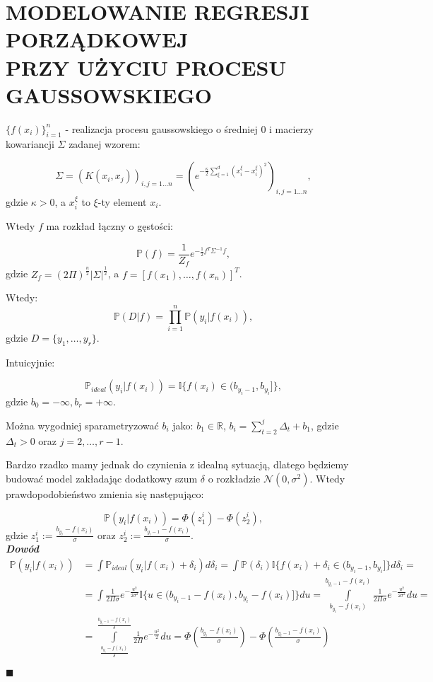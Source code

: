 \documentclass[12pt,a4paper]{article}
\newenvironment{dow}{\textbf{\textit{Dowód}}}{\begin{flushright} $\blacksquare$ \end{flushright}}
\begin{document}

\section*{\centering MODELOWANIE REGRESJI PORZĄDKOWEJ \\PRZY UŻYCIU PROCESU GAUSSOWSKIEGO}

$\lbrace f(x_i) \rbrace_{i=1}^{n}$ - realizacja procesu gaussowskiego o średniej $0$ i macierzy kowariancji $\Sigma$ zadanej wzorem:

$$
\Sigma = \left( K(x_i, x_j) \right)_{i, j=1\ldots n} = \left(e^{-\frac{\kappa}{2}\sum_{\xi=1}^{d}(x_i^\xi-x_i^\xi)^2}\right)_{i, j=1\ldots n},
$$
gdzie  $\kappa>0$, a $x_i^\xi$ to $\xi$-ty element $x_i$.

Wtedy $f$ ma rozkład łączny o gęstości:

$$
\mathbb{P}(f)=\frac{1}{Z_f}e^{-\frac{1}{2}f^T\Sigma^{-1}f}, 
$$
gdzie $Z_f=(2\Pi)^{\frac{n}{2}}|\Sigma|^\frac{1}{2}$, a $f=[f(x_1),\ldots,f(x_n)]^T$.

Wtedy:
$$
\mathbb{P}(D|f) = \prod_{i=1}^n\mathbb{P}(y_i|f(x_i)),
$$
gdzie $D = \lbrace y_1, \ldots, y_r \rbrace$.

Intuicyjnie:

$$
\mathbb{P}_{ideal} (y_i|f(x_i)) = \mathbb{I}\lbrace f(x_i)\in (b_{y_i-1}, b_{y_i}] \rbrace,
$$
gdzie $b_0=-\infty, b_r=+\infty$. 

Można wygodniej sparametryzować $b_i$ jako: $b_1\in\mathbb{R}$, $b_i = \sum_{t=2}^j\Delta_t+b_1$, gdzie $\Delta_t>0$ oraz $j=2, \ldots, r-1$. 

Bardzo rzadko mamy jednak do czynienia z idealną sytuacją, dlatego będziemy budować model zakładając dodatkowy szum $\delta$ o rozkładzie $\mathcal{N}(0, \sigma^2)$. Wtedy prawdopodobieństwo zmienia się następująco:

$$
\mathbb{P} (y_i|f(x_i)) = \Phi\left( z_1^i \right) - \Phi\left( z_2^i \right),
$$
gdzie $z_1^i :=\frac{b_{y_i}-f(x_i)}{\sigma} $ oraz $z_2^i :=\frac{b_{y_i-1}-f(x_i)}{\sigma} $.
\\

\begin{dow}
\begin{align*}
\mathbb{P} (y_i|f(x_i)) 
&= \int \mathbb{P}_{ideal} (y_i |f(x_i)+\delta_i)d\delta_i = \int \mathbb{P}(\delta_i) \mathbb{I}\lbrace f(x_i)+\delta_i\in (b_{y_i-1}, b_{y_i}] \rbrace d\delta_i =\\
&= \int \frac{1}{2\Pi\sigma}e^{-\frac{u^2}{2\sigma^2}} \mathbb{I}\lbrace u\in (b_{y_i-1}-f(x_i), b_{y_i}-f(x_i)] \rbrace du = \int \limits_{b_{y_i}-f(x_i)}^{b_{y_i-1}-f(x_i)}\frac{1}{2\Pi\sigma}e^{-\frac{u^2}{2\sigma^2}} du =\\
&=  \int \limits_{\frac{b_{y_i}-f(x_i)}{\delta}}^{\frac{b_{y_i-1}-f(x_i)}{\delta}}\frac{1}{2\Pi}e^{-\frac{u^2}{2}} du = \Phi\left( \frac{b_{y_i}-f(x_i)}{\sigma} \right) - \Phi\left( \frac{b_{y_i-1}-f(x_i)}{\sigma} \right)
\end{align*}

\end{dow}
\end{document}
